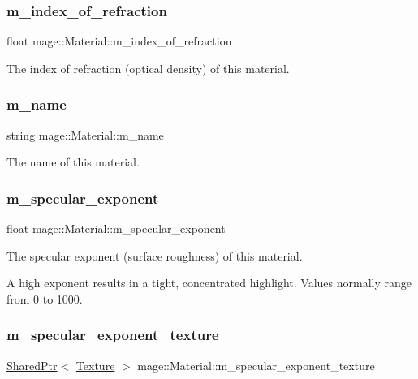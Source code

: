 \subsubsection{\texorpdfstring{m\+\_\+index\+\_\+of\+\_\+refraction}{m\_index\_of\_refraction}}
{\footnotesize\ttfamily float mage\+::\+Material\+::m\+\_\+index\+\_\+of\+\_\+refraction}

The index of refraction (optical density) of this material. \hypertarget{structmage_1_1_material_a2b3e839a8ae093d53b12529d61ec6605}{}\label{structmage_1_1_material_a2b3e839a8ae093d53b12529d61ec6605} 
\subsubsection{\texorpdfstring{m\+\_\+name}{m\_name}}
{\footnotesize\ttfamily string mage\+::\+Material\+::m\+\_\+name}

The name of this material. \hypertarget{structmage_1_1_material_a62a9e8d9f90bf569b9f692c28da6a7dc}{}\label{structmage_1_1_material_a62a9e8d9f90bf569b9f692c28da6a7dc} 
\subsubsection{\texorpdfstring{m\+\_\+specular\+\_\+exponent}{m\_specular\_exponent}}
{\footnotesize\ttfamily float mage\+::\+Material\+::m\+\_\+specular\+\_\+exponent}

The specular exponent (surface roughness) of this material.

A high exponent results in a tight, concentrated highlight. Values normally range from 0 to 1000. \hypertarget{structmage_1_1_material_a452a92691f612bd21857525c00c5e8e5}{}\label{structmage_1_1_material_a452a92691f612bd21857525c00c5e8e5} 
\subsubsection{\texorpdfstring{m\+\_\+specular\+\_\+exponent\+\_\+texture}{m\_specular\_exponent\_texture}}
{\footnotesize\ttfamily \hyperlink{namespacemage_a1e01ae66713838a7a67d30e44c67703e}{Shared\+Ptr}$<$ \hyperlink{classmage_1_1_texture}{Texture} $>$ mage\+::\+Material\+::m\+\_\+specular\+\_\+exponent\+\_\+texture}

